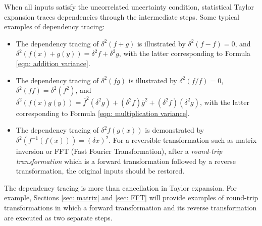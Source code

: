 \documentclass[twoside]{article}
\numberwithin{equation}{section}
\begin{document}
When all inputs satisfy the uncorrelated uncertainty condition, statistical Taylor expansion traces dependencies through the intermediate steps.
Some typical examples of dependency tracing:
\begin{itemize}
\item The dependency tracing of $\delta^2 (f + g)$ is illustrated by $\delta^2 (f - f) = 0$, and $\delta^2 (f(x) + g(y)) = \delta^2 f + \delta^2 g$, with the latter corresponding to Formula \eqref{eqn: addition variance}.   

\item The dependency tracing of $\delta^2 (f g)$ is illustrated by $\delta^2 (f/f) = 0$, $\delta^2 (f f) = \delta^2 (f^2)$, and $\delta^2 (f(x) g(y)) = \overline{f}^2 (\delta^2 g) + (\delta^2 f) \overline{g}^2 +  (\delta^2 f) (\delta^2 g)$, with the latter corresponding to Formula \eqref{eqn: multiplication variance}.  

\item The dependency tracing of $\delta^2 f(g(x))$ is demonstrated by $\delta^2 (f^{-1}(f(x))) = (\delta x)^2$.  
For a reversible transformation such as matrix inversion or FFT (Fast Fourier Transformation), after a \emph{round-trip transformation} which is a forward transformation followed by a reverse transformation, the original inputs should be restored.

\end{itemize}
The dependency tracing is more than cancellation in Taylor expansion.  
For example, Sections \ref{sec: matrix} and \ref{sec: FFT} will provide examples of round-trip transformations in which a forward transformation and its reverse transformation are executed as two separate steps.
\end{document}

